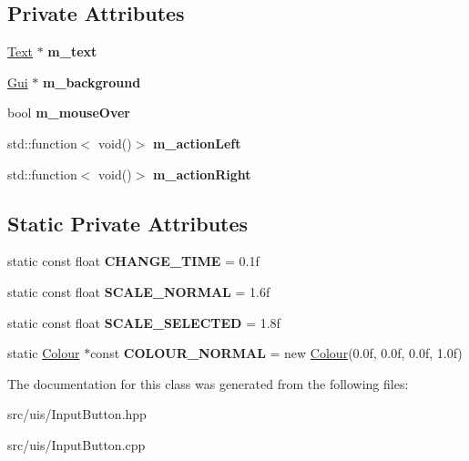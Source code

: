 \subsection*{Private Attributes}
\begin{DoxyCompactItemize}
\item 
\mbox{\label{class_flounder_1_1_input_button_aee4a935e688fe6b5028b45d41b3d7f10}} 
\hyperlink{class_flounder_1_1_text}{Text} $\ast$ {\bfseries m\+\_\+text}
\item 
\mbox{\label{class_flounder_1_1_input_button_abdb505eae75be72f349b53832bf07ede}} 
\hyperlink{class_flounder_1_1_gui}{Gui} $\ast$ {\bfseries m\+\_\+background}
\item 
\mbox{\label{class_flounder_1_1_input_button_a0e3f23979792ea1f87929bb70887dcc6}} 
bool {\bfseries m\+\_\+mouse\+Over}
\item 
\mbox{\label{class_flounder_1_1_input_button_a8ab5122ba9cd0a672cff1c7fbaa0cf0f}} 
std\+::function$<$ void()$>$ {\bfseries m\+\_\+action\+Left}
\item 
\mbox{\label{class_flounder_1_1_input_button_a817e05bff699d4902601eb1910125342}} 
std\+::function$<$ void()$>$ {\bfseries m\+\_\+action\+Right}
\end{DoxyCompactItemize}
\subsection*{Static Private Attributes}
\begin{DoxyCompactItemize}
\item 
\mbox{\label{class_flounder_1_1_input_button_aaf4280eca8569ceb47687741da5d8c94}} 
static const float {\bfseries C\+H\+A\+N\+G\+E\+\_\+\+T\+I\+ME} = 0.\+1f
\item 
\mbox{\label{class_flounder_1_1_input_button_aef3e5764624efb84143858e2d0b371a3}} 
static const float {\bfseries S\+C\+A\+L\+E\+\_\+\+N\+O\+R\+M\+AL} = 1.\+6f
\item 
\mbox{\label{class_flounder_1_1_input_button_a055929cd82e8d90ce8b1257f35bb88d2}} 
static const float {\bfseries S\+C\+A\+L\+E\+\_\+\+S\+E\+L\+E\+C\+T\+ED} = 1.\+8f
\item 
\mbox{\label{class_flounder_1_1_input_button_a7f375d6243cb243c7948240080157b4c}} 
static \hyperlink{class_flounder_1_1_colour}{Colour} $\ast$const {\bfseries C\+O\+L\+O\+U\+R\+\_\+\+N\+O\+R\+M\+AL} = new \hyperlink{class_flounder_1_1_colour}{Colour}(0.\+0f, 0.\+0f, 0.\+0f, 1.\+0f)
\end{DoxyCompactItemize}


The documentation for this class was generated from the following files\+:\begin{DoxyCompactItemize}
\item 
src/uis/Input\+Button.\+hpp\item 
src/uis/Input\+Button.\+cpp\end{DoxyCompactItemize}
